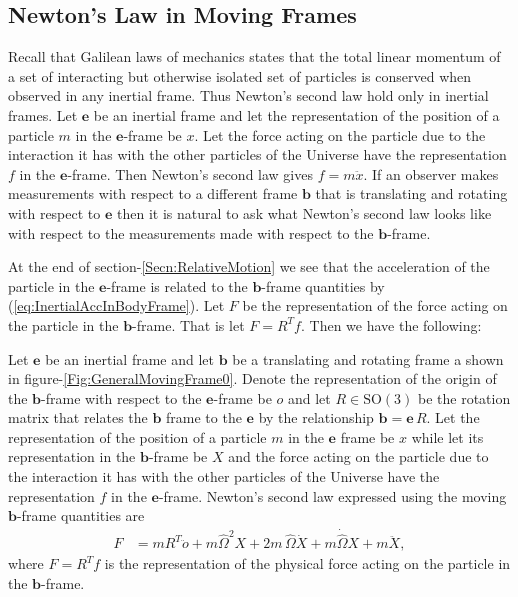 \documentclass[graybox,envcountchap,sectrefs]{svmonoMuga}
\begin{document}
\subsection{Newton's Law in Moving Frames}
Recall that Galilean laws of mechanics states that the total linear momentum of a set of interacting but otherwise isolated set of particles is conserved when observed in any inertial frame. Thus Newton's second law hold only in inertial frames. Let $\mathbf{e}$ be an inertial frame and let the representation of the position of a particle $m$ in the $\mathbf{e}$-frame be $x$. Let the force acting on the particle due to the interaction it has with the other particles of the Universe have the representation $f$ in the $\mathbf{e}$-frame. Then Newton's second law gives $f=m\ddot{x}$. If an observer makes measurements with respect to a different frame $\mathbf{b}$ that is translating and rotating with respect to $\mathbf{e}$ then it is natural to ask what Newton's second law looks like with respect to the measurements made with respect to the 
$\mathbf{b}$-frame. 

 
At the end of section-\ref{Secn:RelativeMotion} we see that the acceleration of the particle in the 
$\mathbf{e}$-frame is related to the $\mathbf{b}$-frame quantities by (\ref{eq:InertialAccInBodyFrame}). 
Let $F$ be the representation of the force acting on the particle in the $\mathbf{b}$-frame. That is let $F=R^Tf$. Then we have the following:
\begin{svgraybox}
Let $\mathbf{e}$ be an inertial frame and let $\mathbf{b}$ be a translating and rotating frame a shown in figure-\ref{Fig:GeneralMovingFrame0}. Denote the representation of the origin of the $\mathbf{b}$-frame with respect to the $\mathbf{e}$-frame be $o$ and let $R\in \mathrm{SO}(3)$ be the rotation matrix that relates the $\mathbf{b}$ frame to the $\mathbf{e}$ by the relationship $\mathbf{b}=\mathbf{e}\,R$.  Let
the representation of the position of a particle $m$ in the $\mathbf{e}$ frame be $x$ while let its representation in the $\mathbf{b}$-frame be $X$ and the force acting on the particle due to the interaction it has with the other particles of the Universe have the representation $f$ in the $\mathbf{e}$-frame.  Newton's second law expressed using the moving $\mathbf{b}$-frame quantities are 
\begin{align}
F&= mR^T\ddot{o}+m\widehat{\Omega}^2 X+2m\,\widehat{\Omega}\dot{X}+m\dot{\widehat{\Omega}}X+m\ddot{X},\label{eq:NewtonInMovingFrames}
\end{align}
where $F=R^Tf$ is the representation of the physical force acting on the particle in the $\mathbf{b}$-frame.
\end{svgraybox}
\end{document}
